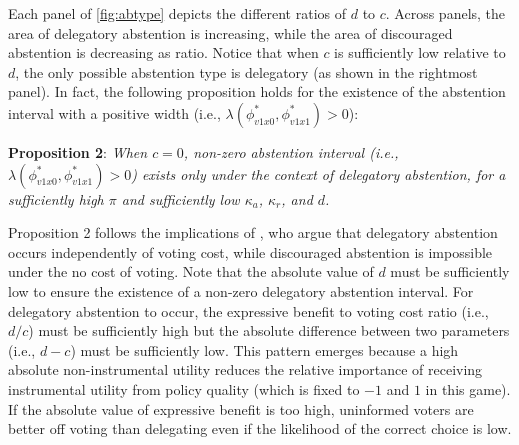 \documentclass[letterpaper, 12pt]{article}
\begin{document}
    \par Each panel of \autoref{fig:abtype} depicts the different ratios of $d$ to $c$. Across panels, the area of delegatory abstention is increasing, while the area of discouraged abstention is decreasing as ratio. Notice that when $c$ is sufficiently low relative to $d$, the only possible abstention type is delegatory (as shown in the rightmost panel). In fact, the following proposition holds for the existence of the abstention interval with a positive width (i.e., $\lambda(\phi^*_{v1x0},\phi^*_{v1x1})>0$):
    
    \noindent \textbf{Proposition 2}: \textit{When $c=0$, non-zero abstention interval (i.e., $\lambda(\phi^*_{v1x0},\phi^*_{v1x1})>0$) exists only under the context of delegatory abstention, for a sufficiently high $\pi$ and sufficiently low $\kappa_a$, $\kappa_r$, and $d$.}
    
    \noindent Proposition 2 follows the implications of \cite{Feddersen1996thsw}, who argue that delegatory abstention occurs independently of voting cost, while discouraged abstention is impossible under the no cost of voting. Note that the absolute value of $d$ must be sufficiently low to ensure the existence of a non-zero delegatory abstention interval. For delegatory abstention to occur, the expressive benefit to voting cost ratio (i.e., $d/c$) must be sufficiently high but the absolute difference between two parameters (i.e., $d-c$) must be sufficiently low. This pattern emerges because a high absolute non-instrumental utility reduces the relative importance of receiving instrumental utility from policy quality (which is fixed to $-1$ and $1$ in this game). If the absolute value of expressive benefit is too high, uninformed voters are better off voting than delegating even if the likelihood of the correct choice is low.
    
\end{document}
